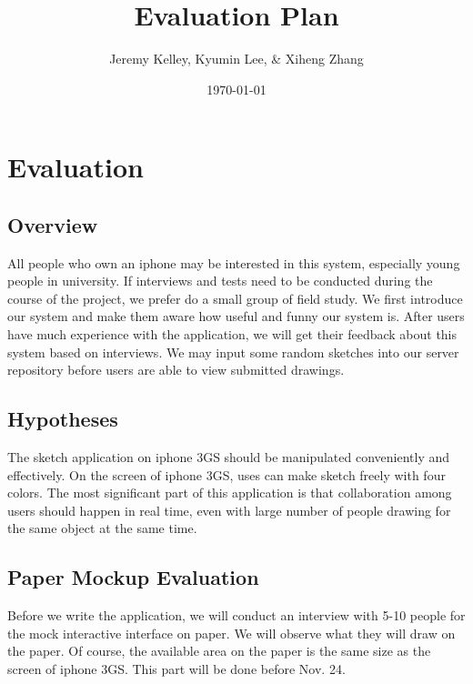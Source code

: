 \documentclass{article}
\begin{document}
\setlength{\parindent}{0pt}
\setlength{\parskip}{.5ex plus 0.5ex minus 0.2ex}




\title{ Evaluation Plan }

\author{ Jeremy Kelley, Kyumin Lee, \& Xiheng Zhang }

\date{\today}

\maketitle

\section{ Evaluation }

\subsection{Overview}

All people who own an iphone may be interested in this system, especially young people in university. If interviews and tests need to be conducted during the course of the project, we prefer do a small group of field study. We first introduce our system and make them aware how useful and funny our system is.  After users have much experience with the application, we will get their feedback about this system based on interviews. We may input some random sketches into our server repository before users are able to view submitted drawings.

\subsection{Hypotheses}
The sketch application on iphone 3GS should be manipulated conveniently and effectively. On the screen of iphone 3GS, uses can make sketch freely with four colors. The most significant part of this application is that collaboration among  users should happen in real time, even with large number of people drawing for the same object at the same time.

\subsection{Paper Mockup Evaluation}
Before we write the application, we will conduct an interview with 5-10 people for the mock interactive interface on paper. We will observe what they will draw on the paper. Of course, the available area on the paper is the same size as the screen of iphone 3GS. This part will be done before Nov. 24.
\end{document}
